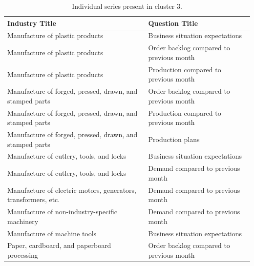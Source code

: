 \begin{table}[H]
\centering
\footnotesize
\begin{tabular}{ll}
\toprule
\textbf{Industry Title} & \textbf{Question Title} \\
\midrule
Manufacture of plastic products & Business situation expectations \\
Manufacture of plastic products & Order backlog compared to previous month \\
Manufacture of plastic products & Production compared to previous month \\
Manufacture of forged, pressed, drawn, and stamped parts & Order backlog compared to previous month \\
Manufacture of forged, pressed, drawn, and stamped parts & Production compared to previous month \\
Manufacture of forged, pressed, drawn, and stamped parts & Production plans \\
Manufacture of cutlery, tools, and locks & Business situation expectations \\
Manufacture of cutlery, tools, and locks & Demand compared to previous month \\
Manufacture of electric motors, generators, transformers, etc. & Demand compared to previous month \\
Manufacture of non-industry-specific machinery & Demand compared to previous month \\
Manufacture of machine tools & Business situation expectations \\
Paper, cardboard, and paperboard processing & Order backlog compared to previous month \\
\bottomrule
\end{tabular}
\caption{Individual series present in cluster 3.}
\label{tab:cluster3_components}
\end{table}
